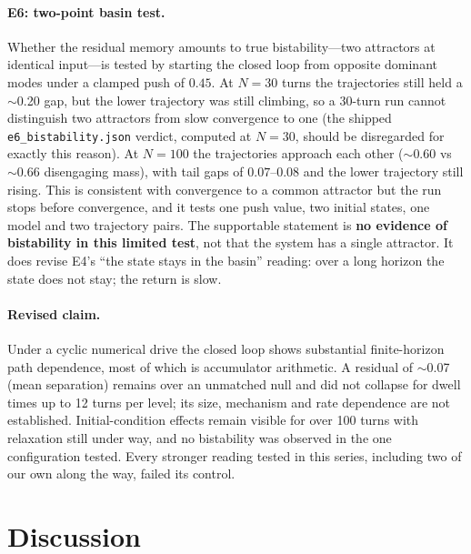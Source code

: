 \documentclass[11pt]{article}
\begin{document}
\paragraph{E6: two-point basin test.} Whether the residual memory amounts to
true bistability---two attractors at identical input---is tested by starting
the closed loop from opposite dominant modes under a clamped push of $0.45$.
At $N=30$ turns the trajectories still held a $\sim$0.20 gap, but the lower
trajectory was still climbing, so a 30-turn run cannot distinguish two
attractors from slow convergence to one (the shipped
\texttt{e6\_bistability.json} verdict, computed at $N=30$, should be
disregarded for exactly this reason). At $N=100$ the trajectories approach
each other ($\sim$0.60 vs $\sim$0.66 disengaging mass), with tail gaps of
$0.07$--$0.08$ and the lower trajectory still rising. This is consistent with
convergence to a common attractor but the run stops before convergence, and it
tests one push value, two initial states, one model and two trajectory pairs.
The supportable statement is \textbf{no evidence of bistability in this limited
test}, not that the system has a single attractor. It does revise E4's ``the
state stays in the basin'' reading: over a long horizon the state does not stay;
the return is slow.

\paragraph{Revised claim.} Under a cyclic numerical drive the closed loop
shows substantial finite-horizon path dependence, most of which is accumulator
arithmetic. A residual of $\sim$0.07 (mean separation) remains over an
unmatched null and did not collapse for dwell times up to 12 turns per level;
its size, mechanism and rate dependence are not established. Initial-condition
effects remain visible for over 100 turns with relaxation still under way, and
no bistability was observed in the one configuration tested. Every stronger
reading tested in this series, including two of our own along the way, failed
its control.

\section{Discussion}
\end{document}
